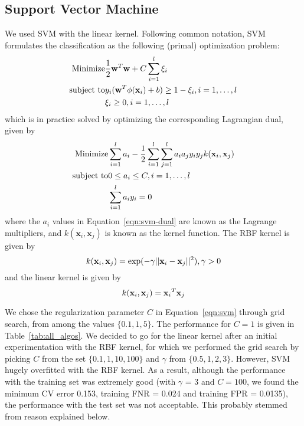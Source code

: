 \subsection{Support Vector Machine}
\label{subsec:svm}
We used SVM \cite{CV95} with the linear kernel. Following common notation, SVM formulates the classification as the following (primal) optimization problem: 
\begin{eqnarray}
\label{eqn:svm}
\mbox{Minimize} & \frac{1}{2}{\mathbf{w}}^T{\mathbf{w}} + C\sum_{i=1}^l{\xi}_i{\nonumber}\\ 
\mbox{subject to} & y_i({\mathbf{w}}^T{\phi}({\mathbf{x}}_i) + b) \ge 1 - {\xi}_i, i = 1,\ldots,l\\
& {\xi}_i \ge 0, i = 1,\ldots,l{\nonumber}
\end{eqnarray}
which is in practice solved by optimizing the corresponding Lagrangian dual, given by
\begin{eqnarray}
\label{eqn:svm-dual}
\mbox{Minimize} & \sum_{i=1}^{l}a_i - \frac{1}{2}\sum_{i=1}^{l}\sum_{j=1}^{l}{a_i}{a_j}{y_i}{y_j}k({\mathbf{x}}_i, {\mathbf{x}}_j){\nonumber}\\ 
\mbox{subject to} & 0 \le a_i \le C, i = 1,\ldots,l\\
& \sum_{i=1}^{l}{a_i}{y_i} = 0{\nonumber}
\end{eqnarray}
where the $a_i$ values in Equation~\ref{eqn:svm-dual} are known as the Lagrange multipliers, and $k({\mathbf{x}}_i, {\mathbf{x}}_j)$ is known as the kernel function. The RBF kernel is given by  
\begin{equation}
\label{eqn:rbf-kern}
k({\mathbf{x}}_i, {\mathbf{x}}_j) = \exp(-\gamma||{\mathbf{x}}_i - {\mathbf{x}}_j||^2), \gamma > 0{\nonumber}
\end{equation}
and the linear kernel is given by
\begin{equation}
\label{eqn:lin-kern}
k({\mathbf{x}}_i, {\mathbf{x}}_j) = {{\mathbf{x}}_i}^T{\mathbf{x}}_j{\nonumber}
\end{equation}

 We chose the regularization parameter $C$ in Equation~\ref{eqn:svm} through grid search, from among the values $\{0.1, 1, 5\}$. The performance for $C = 1$ is given in Table~\ref{tab:all_algos}. We decided to go for the linear kernel after an initial experimentation with the RBF kernel, for which we performed the grid search by picking $C$ from the set $\{0.1, 1, 10, 100\}$ and $\gamma$ from $\{0.5, 1, 2, 3\}$. However, SVM hugely overfitted with the RBF kernel. As a result, although the performance with the training set was extremely good (with $\gamma$ = 3 and $C = 100$, we found the minimum CV error 0.153, training FNR = 0.024 and training FPR = 0.0135), the performance with the test set was not acceptable. This probably stemmed from reason explained below.

